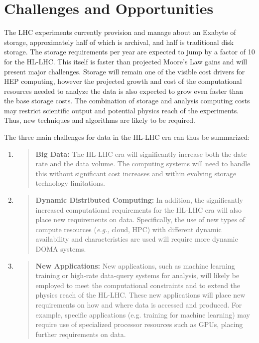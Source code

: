 \documentclass[12pt,a4paper]{article}
\begin{document}
\section{Challenges and
Opportunities}\label{challenges-and-opportunities}

The LHC experiments currently provision and manage about an Exabyte of
storage, approximately half of which is archival, and half is
traditional disk storage. The storage requirements per year are expected
to jump by a factor of 10 for the HL-LHC. This itself is faster than
projected Moore's Law gains and will present major challenges. Storage
will remain one of the visible cost drivers for HEP computing, however
the projected growth and cost of the computational resources needed to
analyze the data is also expected to grow even faster than the base
storage costs. The combination of storage and analysis computing costs
may restrict scientific output and potential physics reach of the
experiments. Thus, new techniques and algorithms are likely to be
required.

The three main challenges for data in the HL-LHC era can thus be
summarized:

\begin{enumerate}
\def\labelenumi{\arabic{enumi}.}
\item
  \begin{quote}
  \textbf{Big Data:} The HL-LHC era will significantly increase both the
  date rate and the data volume. The computing systems will need to
  handle this without significant cost increases and within evolving
  storage technology limitations.
  \end{quote}
\item
  \begin{quote}
  \textbf{Dynamic Distributed Computing:} In addition, the significantly
  increased computational requirements for the HL-LHC era will also
  place new requirements on data. Specifically, the use of new types of
  compute resources (\emph{e.g.,} cloud, HPC) with different dynamic
  availability and characteristics are used will require more dynamic
  DOMA systems.
  \end{quote}
\item
  \begin{quote}
  \textbf{New Applications:} New applications, such as machine learning
  training or high-rate data-query systems for analysis, will likely be
  employed to meet the computational constraints and to extend the
  physics reach of the HL-LHC. These new applications will place new
  requirements on how and where data is accessed and produced. For
  example, specific applications (e.g. training for machine learning)
  may require use of specialized processor resources such as GPUs,
  placing further requirements on data.
  \end{quote}
\end{enumerate}
\end{document}
